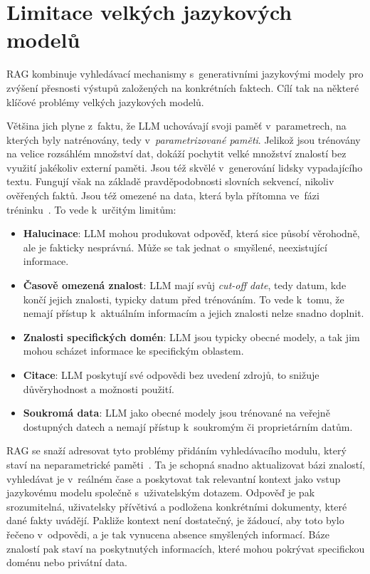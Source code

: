 \section{Limitace velkých jazykových modelů}
RAG kombinuje vyhledávací mechanismy s~generativními jazykovými modely pro zvýšení přesnosti výstupů založených na konkrétních faktech. Cílí tak na některé klíčové problémy velkých jazykových modelů.

Většina jich plyne z~faktu, že LLM uchovávají svoji paměť v~parametrech, na kterých byly natrénovány, tedy v~\textit{parametrizované paměti}. Jelikož jsou trénovány na velice rozsáhlém množství dat, dokáží pochytit velké množství znalostí bez využití jakékoliv externí paměti. Jsou též skvělé v~generování lidsky vypadajícího textu. Fungují však na základě pravděpodobnosti slovních sekvencí, nikoliv ověřených faktů. Jsou též omezené na data, která byla přítomna ve~fázi tréninku~\cite{lewis2020_retrieval_augmented_generation, pan2024_retrieval_augmented_generation}. To vede k~určitým limitům:

\begin{itemize}
    \item \textbf{Halucinace}: LLM mohou produkovat odpověď, která sice působí věrohodně, ale je fakticky nesprávná. Může se tak jednat o~smyšlené, neexistující informace.
    \item \textbf{Časově omezená znalost}: LLM mají svůj \textit{cut-off date}, tedy datum, kde končí jejich znalosti, typicky datum před trénováním. To vede k~tomu, že nemají přístup k~aktuálním informacím a jejich znalosti nelze snadno doplnit.
    \item \textbf{Znalosti specifických domén}: LLM jsou typicky obecné modely, a tak jim mohou scházet informace ke specifickým oblastem.
    \item \textbf{Citace}: LLM poskytují své odpovědi bez uvedení zdrojů, to snižuje důvěryhodnost a možnosti použití.
    \item \textbf{Soukromá data}: LLM jako obecné modely jsou trénované na veřejně dostupných datech a nemají přístup k~soukromým či proprietárním datům.
\end{itemize}

RAG se snaží adresovat tyto problémy přidáním vyhledávacího modulu, který staví na neparametrické paměti~\cite{lewis2020_retrieval_augmented_generation}. Ta je schopná snadno aktualizovat bázi znalostí, vyhledávat je v~reálném čase a poskytovat tak relevantní kontext jako vstup jazykovému modelu společně s~uživatelským dotazem. Odpověď je pak srozumitelná, uživatelsky přívětivá a podložena konkrétními dokumenty, které dané fakty uvádějí. Pakliže kontext není dostatečný, je žádoucí, aby toto bylo řečeno v~odpovědi, a je tak vynucena absence smyšlených informací. Báze znalostí pak staví na poskytnutých informacích, které mohou pokrývat specifickou doménu nebo privátní data.

